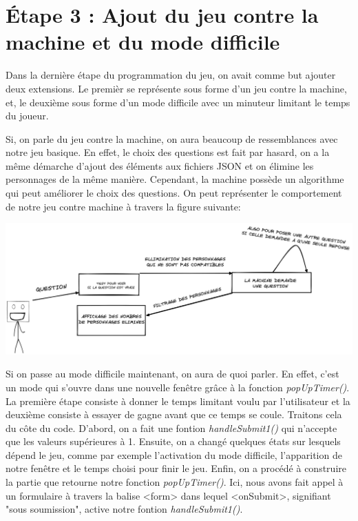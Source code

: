 \documentclass[a4paper, 12pt]{article}
\begin{document}
\section{Étape 3 : Ajout du jeu contre la machine et du mode difficile}
Dans la dernière étape du programmation du jeu, on avait comme but ajouter deux extensions. Le premièr se représente sous forme d'un jeu contre la machine, et, le deuxième sous forme d'un mode difficile avec un minuteur limitant le temps du joueur. \newline 

Si, on parle du jeu contre la machine, on aura beaucoup de ressemblances avec notre jeu basique. En effet, le choix des questions est fait par hasard, on a la même démarche d'ajout des éléments aux fichiers JSON et on élimine les personnages de la même manière. Cependant, la machine possède un algorithme qui peut améliorer le choix des questions. \newline
On peut représenter le comportement de notre jeu contre machine à travers la figure suivante: 
\begin{center}               %
  \includegraphics[scale=0.5]{diagram.png}   %
\end{center}



Si on passe au mode difficile maintenant, on aura de quoi parler. En effet, c'est un mode qui s'ouvre dans une nouvelle fenêtre grâce à la fonction \textit{ popUpTimer()}. La première étape consiste à donner le temps limitant voulu par l'utilisateur et la deuxième consiste à essayer de gagne avant que ce temps se coule.\newline
Traitons cela du côte du code. D'abord, on a fait une fontion \textit{handleSubmit1()} qui n'accepte que les valeurs supérieures à 1. Ensuite, on a changé quelques états sur lesquels dépend le jeu, comme par exemple l'activation du mode difficile, l'apparition de notre fenêtre et le temps choisi pour finir le jeu. Enfin, on  a procédé à construire la partie que retourne notre fonction \textit{popUpTimer()}. Ici, nous avons fait appel à un formulaire à travers la balise <form> dans lequel <onSubmit>, signifiant "sous soumission", active notre fontion \textit{handleSubmit1()}.\newline
\end{document}
